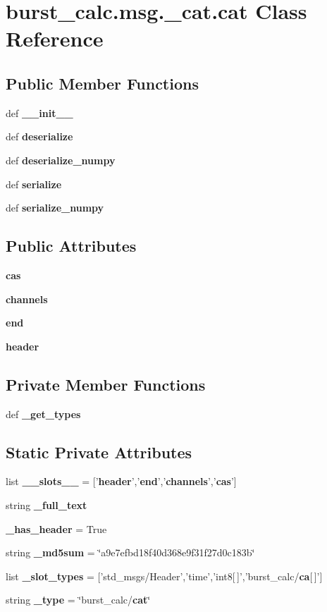 \section{burst\-\_\-calc.\-msg.\-\_\-cat.\-cat \-Class \-Reference}
\label{classburst__calc_1_1msg_1_1__cat_1_1cat}
\subsection*{\-Public \-Member \-Functions}
\begin{DoxyCompactItemize}
\item 
def {\bf \-\_\-\-\_\-init\-\_\-\-\_\-}
\item 
def {\bf deserialize}
\item 
def {\bf deserialize\-\_\-numpy}
\item 
def {\bf serialize}
\item 
def {\bf serialize\-\_\-numpy}
\end{DoxyCompactItemize}
\subsection*{\-Public \-Attributes}
\begin{DoxyCompactItemize}
\item 
{\bf cas}
\item 
{\bf channels}
\item 
{\bf end}
\item 
{\bf header}
\end{DoxyCompactItemize}
\subsection*{\-Private \-Member \-Functions}
\begin{DoxyCompactItemize}
\item 
def {\bf \-\_\-get\-\_\-types}
\end{DoxyCompactItemize}
\subsection*{\-Static \-Private \-Attributes}
\begin{DoxyCompactItemize}
\item 
list {\bf \-\_\-\-\_\-slots\-\_\-\-\_\-} = ['{\bf header}','{\bf end}','{\bf channels}','{\bf cas}']
\item 
string {\bf \-\_\-full\-\_\-text}
\item 
{\bf \-\_\-has\-\_\-header} = \-True
\item 
string {\bf \-\_\-md5sum} = \char`\"{}a9e7efbd18f40d368e9f31f27d0c183b\char`\"{}
\item 
list {\bf \-\_\-slot\-\_\-types} = ['std\-\_\-msgs/\-Header','time','int8[$\,$]','burst\-\_\-calc/{\bf ca}[$\,$]']
\item 
string {\bf \-\_\-type} = \char`\"{}burst\-\_\-calc/{\bf cat}\char`\"{}
\end{DoxyCompactItemize}


